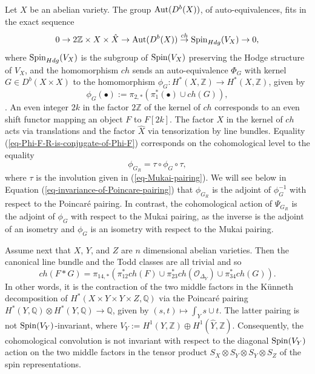 \documentclass[12pt]{amsart}
\numberwithin{equation}{subsection}
\theoremstyle{plain}
\theoremstyle{definition}
\newcommand{\QQ}{{\mathbb Q}}
\newcommand{\ZZ}{{\mathbb Z}}
\newcommand{\Spin}{{\rm Spin}}
\newcommand{\RightArrowOf}[1]{\stackrel{#1}{\rightarrow}}
\newcommand{\StructureSheaf}[1]{{\mathcal O}_{#1}}
\newcommand{\Aut}{{\rm Aut}}
\begin{document}
Let $X$ be an abelian variety. 
The group $\Aut(D^b(X))$, of auto-equivalences, 
fits in the exact sequence
\begin{equation}
\label{eq-short-exact-sequence-of-auto-equivalences}
0\rightarrow 2\ZZ\times X\times \hat{X}\rightarrow \Aut(D^b(X)) \RightArrowOf{ch} \Spin_{Hdg}(V_X)\rightarrow 0,
\end{equation}
where $\Spin_{Hdg}(V_X)$ is the subgroup of $\Spin(V_X)$ preserving the Hodge structure of $V_X$,
and the homomorphism $ch$ sends an auto-equivalence $\Phi_G$ with kernel $G\in D^b(X\times X)$ to the homomorphism
$\phi_G:H^*(X,\ZZ)\rightarrow H^*(X,\ZZ)$, given by
\[
\phi_G(\bullet):=\pi_{2,*}(\pi_1^*(\bullet)\cup ch(G)),
\]
\cite[Prop. 4.3.7 and Cor. 4.3.8]{golyshev-luntz-orlov}. An even integer $2k$ in the factor $2\ZZ$ of the kernel of $ch$ corresponds to an even shift functor mapping an object $F$ to $F[2k]$. The factor $X$ in the kernel of $ch$ acts via translations and the factor $\hat{X}$ via tensorization by line bundles. Equality (\ref{eq-Phi-F-R-is-conjugate-of-Phi-F}) corresponds on the cohomological level to the equality 
\begin{equation}
\label{eq-phi-G-R-is-tau-conjugate-of-phi-G}
\phi_{G_R}=\tau\circ\phi_G\circ\tau,
\end{equation}
where $\tau$ is the involution given in (\ref{eq-Mukai-pairing}). We will see below in Equation (\ref{eq-invariance-of-Poincare-pairing}) that $\phi_{G_R}$ is the adjoint of $\phi_G^{-1}$ with respect to the Poincar\'{e} pairing. In contrast, the cohomological action of $\Psi_{G_R}$ is the adjoint of $\phi_G$ with respect to the Mukai pairing, as the inverse is the adjoint of an isometry and $\phi_G$ is an isometry with respect to the Mukai pairing.

Assume next that $X$, $Y$, and $Z$ are $n$ dimensional abelian varieties. Then the canonical line bundle and the Todd classes are all trivial and so 
\[
ch(F\ast G) = \pi_{14,*}(\pi_{12}^*ch(F)\cup \pi_{23}^*ch(\StructureSheaf{\Delta_Y})\cup\pi_{34}^*ch(G)).
\]
In other words, it is the contraction of the two middle factors in the K\"{u}nneth decomposition 
of $H^*(X\times Y\times Y\times Z,\QQ)$ via the Poincar\'{e} pairing $H^*(Y,\QQ)\otimes H^*(Y,\QQ)\rightarrow \QQ$,
given by $(s,t)\mapsto \int_Ys\cup t.$
The latter pairing is not $\Spin(V_Y)$-invariant, where $V_Y:=H^1(Y,\ZZ)\oplus H^1(\hat{Y},\ZZ)$. 
Consequently, the cohomological convolution is not invariant with respect to the diagonal
$\Spin(V_Y)$ action on the two middle factors in the tensor product $S_X\otimes S_Y\otimes S_Y\otimes S_Z$
of the spin representations.
\end{document}
